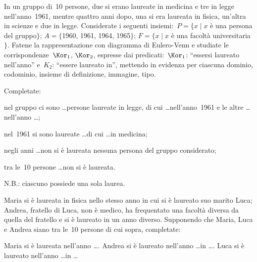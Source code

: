 \begin{esercizio}
\label{ese:C.10}
In un gruppo di~10 persone, due si erano laureate in medicina e tre in legge nell'anno~1961, mentre quattro anni dopo, una si era laureata in fisica, un'altra in scienze e due in legge.
Considerate i seguenti insiemi:~$P=\{x \mid  x$ è una persona del gruppo$\}$; $A=\{$1960, 1961, 1964, 1965$\}$; $F=\{x \mid  x$ è una facoltà universitaria$\}$.
Fatene la rappresentazione con diagramma di Eulero-Venn e studiate le corrispondenze~$\Kor_1$, $\Kor_2$, espresse dai predicati:~$\Kor_1$: ``essersi laureato nell'anno'' e~$K_2$:
``essere laureato in'', mettendo in evidenza per ciascuna dominio, codominio, insieme di definizione, immagine, tipo.

Completate:
\begin{enumeratea}
\item nel gruppo ci sono \ldots persone laureate in legge, di cui \ldots nell'anno~1961 e le altre \ldots nell'anno \ldots;
\item nel~1961 si sono laureate \ldots di cui \ldots in medicina;
\item negli anni \ldots non si è laureata nessuna persona del gruppo considerato;
\item tra le~10 persone \ldots non si è laureata.
\end{enumeratea}
N.B.: ciascuno possiede una sola laurea.

Maria si è laureata in fisica nello stesso anno in cui si è laureato suo marito Luca; Andrea, fratello di Luca, non è medico, ha frequentato una facoltà diversa da quella del fratello
e si è laureato in un anno diverso. Supponendo che Maria, Luca e Andrea siano tra le~10 persone di cui sopra, completate:

Maria si è laureata nell'anno \ldots. Andrea si è laureato nell'anno \ldots in \ldots. Luca si è laureato nell'anno \ldots in \ldots
\end{esercizio}
